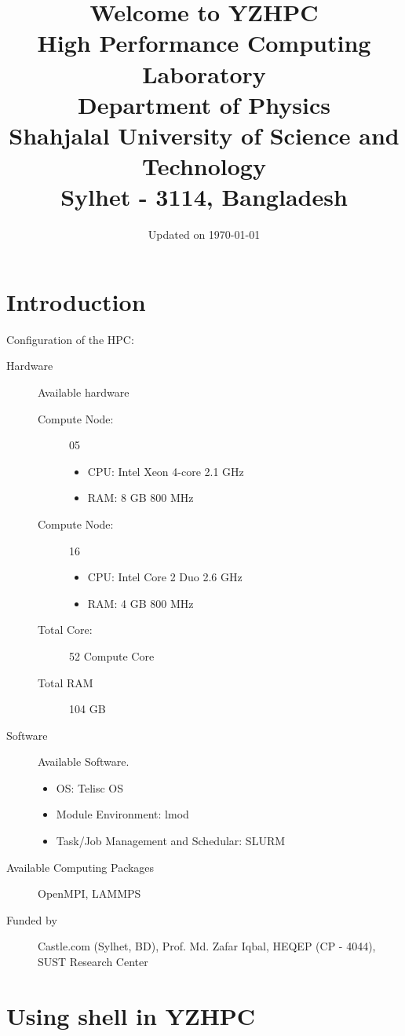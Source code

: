 \documentclass{book}
\title{Welcome to YZHPC \\ 
{\small High Performance Computing Laboratory \\
Department of Physics \\
Shahjalal University of Science and Technology \\
Sylhet - 3114, Bangladesh}
}
\date{Updated on \today}
\begin{document}
\maketitle
\newpage


\chapter{Introduction}%
\label{cha:introduction}

Configuration of the HPC:
\begin{description}
	\item[Hardware] Available hardware
		\begin{description}
			\item[Compute Node: ] 05
				\begin{itemize}
					\item CPU: Intel Xeon 4-core 2.1 GHz
					\item RAM: 8 GB 800 MHz
				\end{itemize}
			\item[Compute Node: ] 16
				\begin{itemize}
					\item CPU: Intel Core 2 Duo 2.6 GHz
					\item RAM: 4 GB 800 MHz
				\end{itemize}
			\item[Total Core: ] 52 Compute Core
			\item[Total RAM] 104 GB
		\end{description}
	\item[Software] Available Software.
		\begin{itemize}
			\item OS: Telisc OS
			\item Module Environment: lmod
			\item Task/Job Management and Schedular: SLURM
		\end{itemize}
	\item[Available Computing Packages] OpenMPI, LAMMPS
	\item[Funded by] Castle.com (Sylhet, BD), Prof. Md. Zafar Iqbal, HEQEP (CP - 4044), SUST Research Center
\end{description}


\chapter{Using shell in YZHPC}%
\label{cha:using_shell_in_yzhpc}
\end{document}
